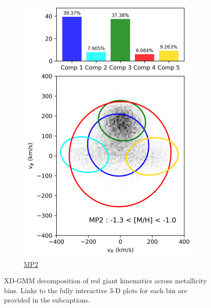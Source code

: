 \documentclass[a4paper,10pt]{article}
\begin{document}
\begin{multicols}{2}
\begin{figure}[H]
\begin{subfigure}[t]{0.24\linewidth}
    \includegraphics[width=\linewidth]{../figures/gmm_MP2.png}
    \caption{\href{https://raw.githack.com/raunaq-rai/Disentangling-the-Milky-Way-using-GMM/main/figures/MP2\_\_-1.3\%5BM\_H\%5D-1.0.html}{MP2}}
    \label{fig:gmm_mp2}
  \end{subfigure}

  \caption{XD-GMM decomposition of red giant kinematics across metallicity bins. Links to the fully interactive 3-D plots for each bin are provided in the subcaptions.}
  \label{fig:gmm_zhang}
\end{figure}



\end{multicols}
\end{document}
